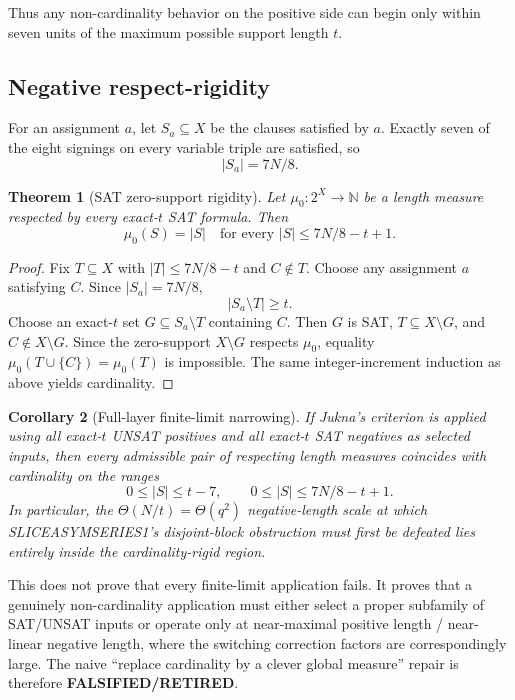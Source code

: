 \documentclass[11pt]{article}
\newtheorem{theorem}{Theorem}
\newtheorem{corollary}[theorem]{Corollary}
\newcommand{\RET}{\textbf{FALSIFIED/RETIRED}}
\begin{document}
Thus any non-cardinality behavior on the positive side can begin only within seven units of the maximum possible support length $t$.

\subsection{Negative respect-rigidity}
For an assignment $a$, let $S_a\subseteq X$ be the clauses satisfied by $a$. Exactly seven of the eight signings on every variable triple are satisfied, so
\[|S_a|=7N/8.\]

\begin{theorem}[SAT zero-support rigidity]
Let $\mu_0:2^X\to\mathbb N$ be a length measure respected by every exact-$t$ SAT formula. Then
\[\boxed{\mu_0(S)=|S|\quad\text{for every }|S|\le 7N/8-t+1.}\]
\end{theorem}
\begin{proof}
Fix $T\subseteq X$ with $|T|\le7N/8-t$ and $C\notin T$. Choose any assignment $a$ satisfying $C$. Since $|S_a|=7N/8$,
\[|S_a\setminus T|\ge t.\]
Choose an exact-$t$ set $G\subseteq S_a\setminus T$ containing $C$. Then $G$ is SAT, $T\subseteq X\setminus G$, and $C\notin X\setminus G$. Since the zero-support $X\setminus G$ respects $\mu_0$, equality $\mu_0(T\cup\{C\})=\mu_0(T)$ is impossible. The same integer-increment induction as above yields cardinality.
\end{proof}

\begin{corollary}[Full-layer finite-limit narrowing]
If Jukna's criterion is applied using \emph{all} exact-$t$ UNSAT positives and all exact-$t$ SAT negatives as selected inputs, then every admissible pair of respecting length measures coincides with cardinality on the ranges
\[0\le |S|\le t-7,\qquad 0\le |S|\le7N/8-t+1.\]
In particular, the $\Theta(N/t)=\Theta(q^2)$ negative-length scale at which SLICEASYMSERIES1's disjoint-block obstruction must first be defeated lies entirely inside the cardinality-rigid region.
\end{corollary}

This does not prove that every finite-limit application fails. It proves that a genuinely non-cardinality application must either select a proper subfamily of SAT/UNSAT inputs or operate only at near-maximal positive length / near-linear negative length, where the switching correction factors are correspondingly large. The naive ``replace cardinality by a clever global measure'' repair is therefore \RET.
\end{document}
